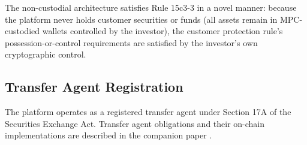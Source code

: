 The non-custodial architecture satisfies Rule 15c3-3 in a novel manner: because the platform never holds customer securities or funds (all assets remain in MPC-custodied wallets controlled by the investor), the customer protection rule's possession-or-control requirements are satisfied by the investor's own cryptographic control.

\subsection{Transfer Agent Registration}

The platform operates as a registered transfer agent under Section 17A of the Securities Exchange Act. Transfer agent obligations and their on-chain implementations are described in the companion paper \cite{lux-transfer-agent}.


